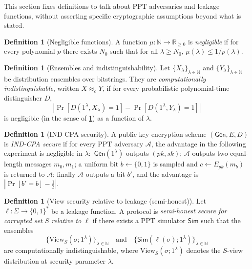 \documentclass[11pt,a4paper]{article}
\theoremstyle{definition}
\newtheorem{definition}[theorem]{Definition}
\theoremstyle{remark}
\newcommand{\N}{\mathbb{N}}
\newcommand{\View}{\mathrm{View}}
\newcommand{\PPT}{\mathrm{PPT}}
\begin{document}
This section fixes definitions to talk about \(\PPT\) adversaries and leakage functions, without asserting specific cryptographic assumptions beyond what is stated.

\begin{definition}[Negligible functions]
\label{def:negl}
A function \(\mu:\N\to\mathbb{R}_{\ge 0}\) is \emph{negligible} if for every polynomial \(p\) there exists \(N_0\) such that for all \(\lambda\ge N_0\), \(\mu(\lambda)\le 1/p(\lambda)\).
\end{definition}

\begin{definition}[Ensembles and indistinguishability]
\label{def:indist}
Let \(\{X_\lambda\}_{\lambda\in\N}\) and \(\{Y_\lambda\}_{\lambda\in\N}\) be distribution ensembles over bitstrings. They are \emph{computationally indistinguishable}, written \(X \approx_c Y\), if for every probabilistic polynomial-time distinguisher \(D\),
\[
\left| \Pr[D(1^\lambda, X_\lambda)=1] - \Pr[D(1^\lambda, Y_\lambda)=1] \right|
\]
is negligible (in the sense of \cref{def:negl}) as a function of \(\lambda\).
\end{definition}

\begin{definition}[IND-CPA security]
\label{def:indcpa}
A public-key encryption scheme \((\mathsf{Gen},E,D)\) is \emph{IND-CPA secure} if for every \(\PPT\) adversary \(\mathcal{A}\), the advantage in the following experiment is negligible in \(\lambda\):\ \(\mathsf{Gen}(1^\lambda)\) outputs \((pk,sk)\); \(\mathcal{A}\) outputs two equal-length messages \(m_0,m_1\); a uniform bit \(b\leftarrow\{0,1\}\) is sampled and \(c\leftarrow E_{pk}(m_b)\) is returned to \(\mathcal{A}\); finally \(\mathcal{A}\) outputs a bit \(b'\), and the advantage is \(|\Pr[b'=b]-\tfrac12|\).
\end{definition}

\begin{definition}[View security relative to leakage (semi-honest)]
\label{def:leakage-security}
Let \(\ell:\Sigma \to \{0,1\}^\ast\) be a leakage function. A protocol is \emph{semi-honest secure for corrupted set \(S\) relative to \(\ell\)} if there exists a \(\PPT\) simulator \(\mathsf{Sim}\) such that the ensembles
\[
\{\View_S(\sigma;1^\lambda)\}_{\lambda\in\N}
\quad\text{and}\quad
\{\mathsf{Sim}(\ell(\sigma);1^\lambda)\}_{\lambda\in\N}
\]
are computationally indistinguishable, where \(\View_S(\sigma;1^\lambda)\) denotes the \(S\)-view distribution at security parameter \(\lambda\).
\end{definition}
\end{document}
